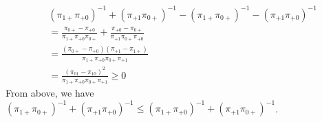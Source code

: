 \documentclass[11pt]{article} %
\begin{document}
\begin{itemize}
\begin{align*}
		&(\pi_{1+}\pi_{+0})^{-1} + (\pi_{+1}\pi_{0+})^{-1} - (\pi_{1+}\pi_{0+})^{-1} - (\pi_{+1}\pi_{+0})^{-1}\\
		&= \frac{\pi_{0+}- \pi_{+0}}{\pi_{1+}\pi_{+0}\pi_{0+}} + \frac{\pi_{+0} - \pi_{0+}}{\pi_{+1}\pi_{0+}\pi_{+0}}\\
		&= \frac{(\pi_{0+}-\pi_{+0})(\pi_{+1}-\pi_{1+})}{\pi_{1+}\pi_{+0}\pi_{0+}\pi_{+1}}\\
		&=  \frac{(\pi_{01}-\pi_{10})^2}{\pi_{1+}\pi_{+0}\pi_{0+}\pi_{+1}} \geq 0
	\end{align*}
	From above, we have $(\pi_{1+}\pi_{0+})^{-1} + (\pi_{+1}\pi_{+0})^{-1} \leq (\pi_{1+}\pi_{+0})^{-1} + (\pi_{+1}\pi_{0+})^{-1}$.
\end{itemize}
\end{document}
